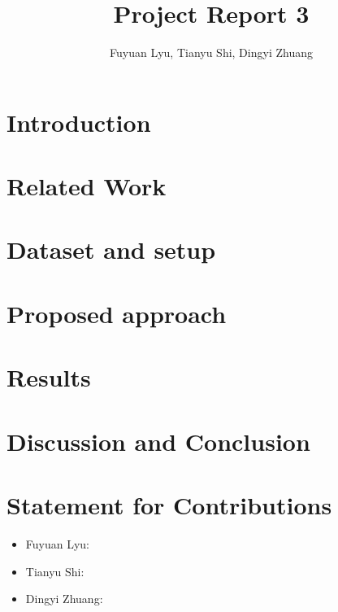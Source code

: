 \documentclass[11pt]{scrartcl}
\title{Project Report 3}
\author{Fuyuan Lyu, Tianyu Shi, Dingyi Zhuang}
\begin{document}
\maketitle

\begin{abstract}

\end{abstract}

\section{Introduction}


\section{Related Work}


\section{Dataset and setup}


\section{Proposed approach}


\section{Results}


\section{Discussion and Conclusion}

\section{Statement for Contributions}
\begin{itemize}
	\item Fuyuan Lyu: 
	\item Tianyu Shi: 
	\item Dingyi Zhuang: 
\end{itemize}
\newpage



\end{document}
